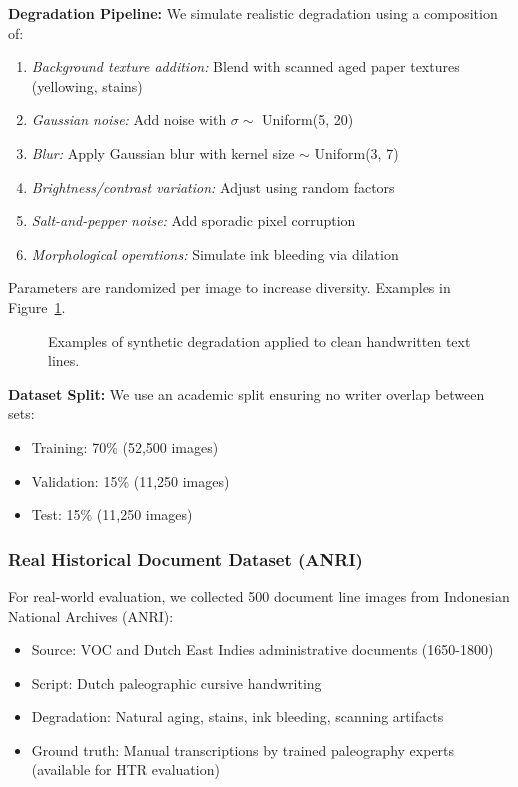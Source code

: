 \documentclass[journal]{IEEEtran}
\begin{document}
\textbf{Degradation Pipeline:} We simulate realistic degradation using a composition of:
\begin{enumerate}
    \item \textit{Background texture addition:} Blend with scanned aged paper textures (yellowing, stains)
    \item \textit{Gaussian noise:} Add noise with $\sigma \sim$ Uniform(5, 20)
    \item \textit{Blur:} Apply Gaussian blur with kernel size $\sim$ Uniform(3, 7)
    \item \textit{Brightness/contrast variation:} Adjust using random factors
    \item \textit{Salt-and-pepper noise:} Add sporadic pixel corruption
    \item \textit{Morphological operations:} Simulate ink bleeding via dilation
\end{enumerate}

Parameters are randomized per image to increase diversity. Examples in Figure~\ref{fig:synthetic_examples}.

\begin{figure}[!t]
\centering
\caption{Examples of synthetic degradation applied to clean handwritten text lines.}
\label{fig:synthetic_examples}
\end{figure}

\textbf{Dataset Split:} We use an academic split ensuring no writer overlap between sets:
\begin{itemize}
    \item Training: 70\% (52,500 images)
    \item Validation: 15\% (11,250 images)
    \item Test: 15\% (11,250 images)
\end{itemize}

\subsubsection{Real Historical Document Dataset (ANRI)}

For real-world evaluation, we collected 500 document line images from Indonesian National Archives (ANRI):
\begin{itemize}
    \item Source: VOC and Dutch East Indies administrative documents (1650-1800)
    \item Script: Dutch paleographic cursive handwriting
    \item Degradation: Natural aging, stains, ink bleeding, scanning artifacts
    \item Ground truth: Manual transcriptions by trained paleography experts (available for HTR evaluation)
\end{itemize}
\end{document}
